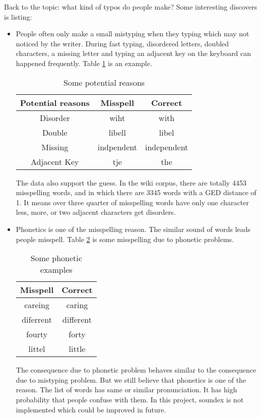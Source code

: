 \documentclass[11pt]{article}
\begin{document}
Back to the topic: what kind of typos do people make? Some interesting discovers is listing:
\begin{itemize}
\item People often only make a small mistyping when they typing which may not noticed by the writer. During fast typing, disordered letters, doubled characters, a missing letter and typing an adjacent key on the keyboard can happened frequently. Table \ref{table4} is an example.

\begin{table}[h]
\begin{center}
\begin{tabular}{|c|c|c|}
    \hline
    Potential reasons & Misspell & Correct\\
    \hline
    \hline
    Disorder & wiht & with\\
	 \hline    
    Double & libell & libel\\
    \hline
    Missing & indpendent & independent\\
    \hline
    Adjacent Key & tje & the\\
    \hline
\end{tabular}
\caption{Some potential reasons}
\label{table4}
\end{center}
\end{table}
The data also support the guess. In the wiki corpus, there are totally 4453 misspelling words, and in which there are 3345 words with a GED distance of 1. It means over three quarter of misspelling words have only one character less, more, or two adjacent characters get disorders.

\item Phonetics is one of the misspelling reason. The similar sound of words leads people misspell. Table \ref{table5} is some misspelling due to phonetic problems.

\begin{table}[h]
\begin{center}
\begin{tabular}{|c|c|}
    \hline
    Misspell & Correct\\
    \hline
    \hline
    careing & caring\\
	  \hline    
    diferrent & different\\
    \hline
    fourty & forty\\
    \hline
    littel & little\\
    \hline
\end{tabular}
\caption{Some phonetic examples}
\label{table5}
\end{center}
\end{table}
The consequence due to phonetic problem behaves similar to the consequence due to mistyping problem. But we still believe that phonetics is one of the reason. The list of words has same or similar pronunciation. It has high probability that people confuse with them. In this project, soundex is not implemented which could be improved in future.

\end{itemize}
\end{document}
